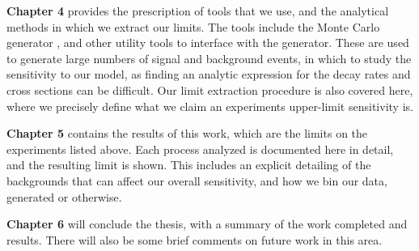 \textbf{Chapter 4} provides the prescription of tools that we use, and the analytical methods in which we extract our limits.
The tools include the Monte Carlo generator \madgraph, and other utility tools to interface with the generator.
These are used to generate large numbers of signal and background events, in which to study the sensitivity to our model, as finding an analytic expression for the decay rates and cross sections can be difficult.
Our limit extraction procedure is also covered here, where we precisely define what we claim an experiments upper-limit sensitivity is.

\textbf{Chapter 5} contains the results of this work, which are the limits on the experiments listed above.
Each process analyzed is documented here in detail, and the resulting limit is shown.
This includes an explicit detailing of the backgrounds that can affect our overall sensitivity, and how we bin our data, generated or otherwise.

\textbf{Chapter 6} will conclude the thesis, with a summary of the work completed and results.
There will also be some brief comments on future work in this area.
